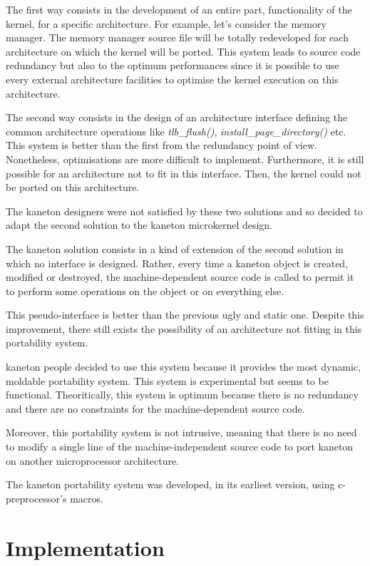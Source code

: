 \begin{multicols}{2}
The first way consists in the development of an entire part, functionality
of the kernel, for a specific architecture. For example, let's consider the
memory manager. The memory manager source file will be totally redeveloped
for each architecture on which the kernel will be ported. This system leads
to source code redundancy but also to the optimum performances since
it is possible to use every external architecture facilities to optimise
the kernel execution on this architecture.

The second way consists in the design of an architecture interface defining
the common architecture operations like \textit{tlb\_flush()},
\textit{install\_page\_directory()} etc. This system is better than the
first from the redundancy point of view. Nonetheless, optimisations are more
difficult to implement. Furthermore, it is still possible for an architecture
not to fit in this interface. Then, the kernel could not be ported on
this architecture.

The kaneton designers were not satisfied by these two solutions and so
decided to adapt the second solution to the kaneton microkernel design.

The kaneton solution consists in a kind of extension of the second solution
in which no interface is designed. Rather, every time a kaneton object is
created, modified or destroyed, the machine-dependent source code is called
to permit it to perform some operations on the object or on everything else.

This pseudo-interface is better than the previous ugly and static one.
Despite this improvement, there still exists the possibility of an
architecture not fitting in this portability system.

kaneton people decided to use this system because it provides the most
dynamic, moldable portability system. This system is experimental but
seems to be functional. Theoritically, this system is optimum because
there is no redundancy and there are no constraints for the
machine-dependent source code.

Moreover, this portability system is not intrusive, meaning that there
is no need to modify a single line of the machine-independent source code
to port kaneton on another microprocessor architecture.

The kaneton portability system was developed, in its earliest version,
using c-preprocessor's macros.

%
%

\section{Implementation}


\end{multicols}
